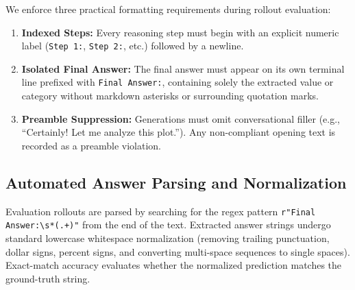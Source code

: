 \documentclass[11pt]{article}
\begin{document}
We enforce three practical formatting requirements during rollout evaluation:
\begin{enumerate}[noitemsep,topsep=1pt]
    \item \textbf{Indexed Steps:} Every reasoning step must begin with an explicit numeric label (\texttt{Step 1:}, \texttt{Step 2:}, etc.) followed by a newline.
    \item \textbf{Isolated Final Answer:} The final answer must appear on its own terminal line prefixed with \texttt{Final Answer:}, containing solely the extracted value or category without markdown asterisks or surrounding quotation marks.
    \item \textbf{Preamble Suppression:} Generations must omit conversational filler (e.g., ``Certainly! Let me analyze this plot.''). Any non-compliant opening text is recorded as a preamble violation.
\end{enumerate}

\subsection{Automated Answer Parsing and Normalization}
\label{subsec:appendix_parser}

Evaluation rollouts are parsed by searching for the regex pattern \texttt{r"Final Answer:\textbackslash s*(.+)"} from the end of the text. Extracted answer strings undergo standard lowercase whitespace normalization (removing trailing punctuation, dollar signs, percent signs, and converting multi-space sequences to single spaces). Exact-match accuracy evaluates whether the normalized prediction matches the ground-truth string.
\end{document}
